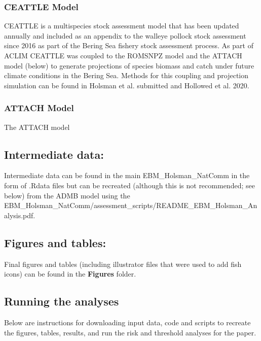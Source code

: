 \documentclass[]{article}
\begin{document}
\subsubsection{CEATTLE Model}\label{ceattle-model}

CEATTLE is a multispecies stock assessment model that has been updated
annually and included as an appendix to the walleye pollock stock
assessment since 2016 as part of the Bering Sea fishery stock assessment
process. As part of ACLIM CEATTLE was coupled to the ROMSNPZ model and
the ATTACH model (below) to generate projections of species biomass and
catch under future climate conditions in the Bering Sea. Methods for
this coupling and projection simulation can be found in Holsman et al.
submitted and Hollowed et al. 2020.

\subsubsection{ATTACH Model}\label{attach-model}

The ATTACH model

\subsection{Intermediate data:}\label{intermediate-data}

Intermediate data can be found in the main EBM\_Holsman\_NatComm in the
form of .Rdata files but can be recreated (although this is not
recommended; see below) from the ADMB model using the
EBM\_Holsman\_NatComm/assessment\_scripts/README\_EBM\_Holsman\_Analysis.pdf.

\subsection{Figures and tables:}\label{figures-and-tables}

Final figures and tables (including illustrator files that were used to
add fish icons) can be found in the \textbf{Figures} folder.

\subsection{Running the analyses}\label{running-the-analyses}

Below are instructions for downloading input data, code and scripts to
recreate the figures, tables, results, and run the risk and threshold
analyses for the paper.
\end{document}
